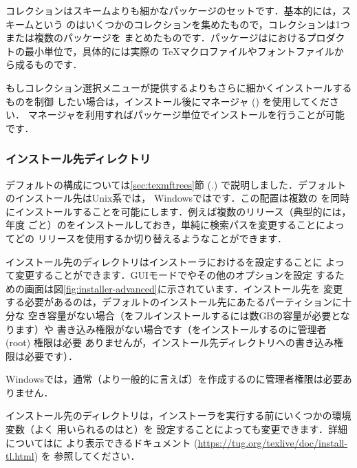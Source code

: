 \documentclass[uplatex,dvipdfmx,tombow]{jsarticle}
\begin{document}
コレクションはスキームよりも細かなパッケージのセットです．基本的には，スキームという
のはいくつかのコレクションを集めたもので，コレクションは1つまたは複数のパッケージを
まとめたものです．パッケージは\TL におけるプロダクトの最小単位で，具体的には実際の
\TeX マクロファイルやフォントファイルから成るものです．

もしコレクション選択メニューが提供するよりもさらに細かくインストールするものを制御
したい場合は，インストール後に\TL マネージャ () を使用してください．
\TL マネージャを利用すればパッケージ単位でインストールを行うことが可能です．

\subsubsection{インストール先ディレクトリ}
\label{sec:directories}

デフォルトの\TL 構成については\ref{sec:texmftrees}節 (\p.\pageref{sec:texmftrees})
で説明しました．デフォルトのインストール先はUnix系では，
Windowsではです．この配置は複数の\TL
を同時にインストールすることを可能にします．例えば複数のリリース（典型的には，年度
ごと）の\TL をインストールしておき，単純に検索パスを変更することによってどの
リリースを使用するか切り替えるようなことができます．

インストール先のディレクトリはインストーラにおけるを設定することに
よって変更することができます．GUIモードでやその他のオプションを設定
するための画面は図\ref{fig:installer-advanced}に示されています．インストール先を
変更する必要があるのは，デフォルトのインストール先にあたるパーティションに十分な
空き容量がない場合（\TL をフルインストールするには数GBの容量が必要となります）や
書き込み権限がない場合です（\TL をインストールするのに管理者 (root) 権限は必要
ありませんが，インストール先ディレクトリへの書き込み権限は必要です）．

Windowsでは，通常（より一般的に言えば）を作成するのに管理者権限は必要ありません．

インストール先のディレクトリは，インストーラを実行する前にいくつかの環境変数（よく
用いられるのはと）を
設定することによっても変更できます．詳細についてはに
より表示できるドキュメント (\url{https://tug.org/texlive/doc/install-tl.html}) を
参照してください．
\end{document}
